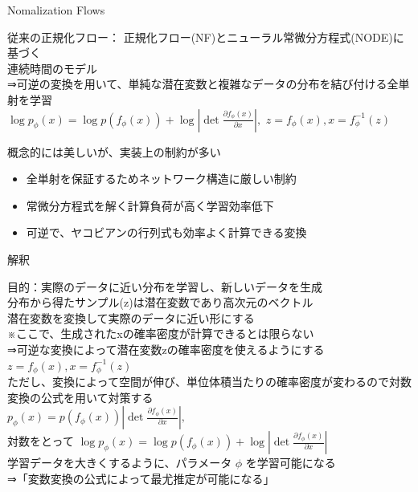 \begin{frame}{Nomalization Flows}
    \begin{block}{従来の正規化フロー：}
    正規化フロー(NF)とニューラル常微分方程式(NODE)に基づく\\
    連続時間のモデル\\
    ⇒可逆の変換を用いて、単純な潜在変数と複雑なデータの分布を結び付ける全単射を学習\\
    $\log p_{\phi}(x)=\log p(f_{\phi}(x))+\log\left|\det\frac{\partial f_{\phi}(x)}{\partial x}\right|,$
    $z=f_{\phi}(x),x=f_{\phi}^{-1}(z)$\\
    \end{block}
    概念的には美しいが、実装上の制約が多い\\
    \begin{itemize}
        \item 全単射を保証するためネットワーク構造に厳しい制約
        \item 常微分方程式を解く計算負荷が高く学習効率低下
        \item 可逆で、ヤコビアンの行列式も効率よく計算できる変換
    \end{itemize}
\end{frame}
\begin{frame}{解釈}
    \begin{exampleblock}{\small 目的：実際のデータに近い分布を学習し、新しいデータを生成\\}
        \small 分布から得たサンプル(z)は潜在変数であり高次元のベクトル\\
        潜在変数を変換して実際のデータに近い形にする\\
        ※ここで、生成されたxの確率密度が計算できるとは限らない\\
        ⇒可逆な変換によって潜在変数zの確率密度を使えるようにする\\
        $z=f_{\phi}(x),x=f_{\phi}^{-1}(z)$\\
        \vspace{1em}
        ただし、変換によって空間が伸び、単位体積当たりの確率密度が変わるので対数変換の公式を用いて対策する\\
        $p_{\phi}(x)=p(f_{\phi}(x))\left|\det\frac{\partial f_{\phi}(x)}{\partial x}\right|,$\\
        対数をとって
        $\log p_{\phi}(x)=\log p(f_{\phi}(x))+\log\left|\det\frac{\partial f_{\phi}(x)}{\partial x}\right|$\\
        \vspace{1em}
        学習データを大きくするように、パラメータ \(\phi\) を学習可能になる\\
        ⇒「変数変換の公式によって最尤推定が可能になる」
    \end{exampleblock}
\end{frame}

